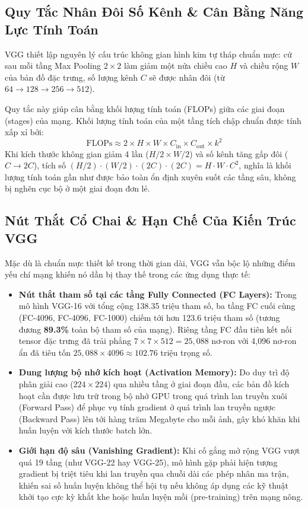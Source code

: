 \documentclass[12pt,a4paper]{report}
\begin{document}
\subsection{Quy Tắc Nhân Đôi Số Kênh \& Cân Bằng Năng Lực Tính Toán}
VGG thiết lập nguyên lý cấu trúc không gian hình kim tự tháp chuẩn mực: cứ sau mỗi tầng Max Pooling $2 \times 2$ làm giảm một nửa chiều cao $H$ và chiều rộng $W$ của bản đồ đặc trưng, số lượng kênh $C$ sẽ được nhân đôi (từ $64 \to 128 \to 256 \to 512$). 

Quy tắc này giúp cân bằng khối lượng tính toán (FLOPs) giữa các giai đoạn (stages) của mạng. Khối lượng tính toán của một tầng tích chập chuẩn được tính xấp xỉ bởi:
\begin{equation}
    \text{FLOPs} \approx 2 \times H \times W \times C_{\text{in}} \times C_{\text{out}} \times k^2
\end{equation}
Khi kích thước không gian giảm 4 lần ($H/2 \times W/2$) và số kênh tăng gấp đôi ($C \to 2C$), tích số $(H/2) \cdot (W/2) \cdot (2C) \cdot (2C) = H \cdot W \cdot C^2$, nghĩa là khối lượng tính toán gần như được bảo toàn ổn định xuyên suốt các tầng sâu, không bị nghẽn cục bộ ở một giai đoạn đơn lẻ.

\subsection{Nút Thắt Cổ Chai \& Hạn Chế Của Kiến Trúc VGG}
Mặc dù là chuẩn mực thiết kế trong thời gian dài, VGG vẫn bộc lộ những điểm yếu chí mạng khiến nó dần bị thay thế trong các ứng dụng thực tế:
\begin{itemize}[leftmargin=*]
    \item \textbf{Nút thắt tham số tại các tầng Fully Connected (FC Layers):}
    Trong mô hình VGG-16 với tổng cộng 138.35 triệu tham số, ba tầng FC cuối cùng (FC-4096, FC-4096, FC-1000) chiếm tới hơn 123.6 triệu tham số (tương đương \textbf{89.3\%} toàn bộ tham số của mạng). Riêng tầng FC đầu tiên kết nối tensor đặc trưng đã trải phẳng $7 \times 7 \times 512 = 25,088$ nơ-ron với 4,096 nơ-ron ẩn đã tiêu tốn $25,088 \times 4096 \approx 102.76$ triệu trọng số.
    \item \textbf{Dung lượng bộ nhớ kích hoạt (Activation Memory):}
    Do duy trì độ phân giải cao ($224 \times 224$) qua nhiều tầng ở giai đoạn đầu, các bản đồ kích hoạt cần được lưu trữ trong bộ nhớ GPU trong quá trình lan truyền xuôi (Forward Pass) để phục vụ tính gradient ở quá trình lan truyền ngược (Backward Pass) lên tới hàng trăm Megabyte cho mỗi ảnh, gây khó khăn khi huấn luyện với kích thước batch lớn.
    \item \textbf{Giới hạn độ sâu (Vanishing Gradient):}
    Khi cố gắng mở rộng VGG vượt quá 19 tầng (như VGG-22 hay VGG-25), mô hình gặp phải hiện tượng gradient bị triệt tiêu khi lan truyền qua chuỗi dài các phép nhân ma trận, khiến sai số huấn luyện không thể hội tụ nếu không áp dụng các kỹ thuật khởi tạo cực kỳ khắt khe hoặc huấn luyện mồi (pre-training) trên mạng nông.
\end{itemize}
\end{document}
